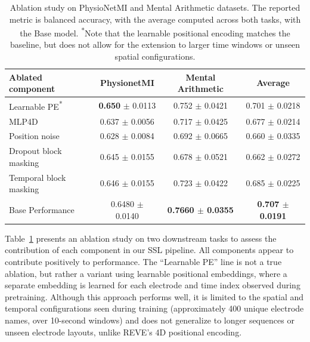 \documentclass{article}
\begin{document}
\begin{table}[h]
\centering
\caption{Ablation study on PhysioNetMI and Mental Arithmetic datasets. The reported metric is balanced accuracy, with the average computed across both tasks, with the Base model.%
\newline\textsuperscript{*}Note that the learnable positional encoding matches the baseline, but does not allow for the extension to larger time windows or unseen spatial configurations.}
\begin{tabular}{lccc}
\toprule
\textbf{Ablated component} & \textbf{PhysionetMI} & \textbf{Mental Arithmetic} & \textbf{Average} \\
\midrule
Learnable PE\textsuperscript{*} & \textbf{0.650} $\pm$ 0.0113 & 0.752 $\pm$ 0.0421 & 0.701 $\pm$ 0.0218  \\
MLP4D                          & 0.637 $\pm$ 0.0056           & 0.717 $\pm$ 0.0425 & 0.677 $\pm$ 0.0214 \\
Position noise                 & 0.628 $\pm$ 0.0084           & 0.692 $\pm$ 0.0665 & 0.660 $\pm$ 0.0335 \\
Dropout block masking          & 0.645 $\pm$ 0.0155           & 0.678 $\pm$ 0.0521 & 0.662 $\pm$ 0.0272 \\
Temporal block masking         & 0.646 $\pm$ 0.0155           & 0.723 $\pm$ 0.0422 & 0.685 $\pm$ 0.0225 \\
\midrule
Base Performance               & 0.6480 $\pm$ 0.0140 & \textbf{0.7660 $\pm$ 0.0355} & \textbf{0.707 $\pm$ 0.0191 } \\
\bottomrule
\end{tabular}
\label{tab:ablation_pe}
\end{table}

Table~\ref{tab:ablation_pe} presents an ablation study on two downstream tasks to assess the contribution of each component in our SSL pipeline. All components appear to contribute positively to performance. The ``Learnable PE'' line is not a true ablation, but rather a variant using learnable positional embeddings, where a separate embedding is learned for each electrode and time index observed during pretraining. Although this approach performs well, it is limited to the spatial and temporal configurations seen during training (approximately 400 unique electrode names, over 10-second windows) and does not generalize to longer sequences or unseen electrode layouts, unlike REVE's 4D positional encoding.


\end{document}
